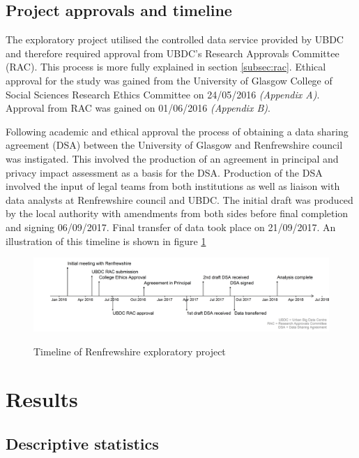 \documentclass[]{article}
\begin{document}
\subsection{Project approvals and timeline}\label{subsec:renf-methods-approvals}

The exploratory project utilised the controlled data service provided by
UBDC and therefore required approval from UBDC's Research Approvals
Committee (RAC). This process is more fully explained in section
\ref{subsec:rac}. Ethical approval for the study was gained from the
University of Glasgow College of Social Sciences Research Ethics
Committee on 24/05/2016 \emph{(Appendix A)}. Approval from RAC was
gained on 01/06/2016 \emph{(Appendix B)}.

Following academic and ethical approval the process of obtaining a data
sharing agreement (DSA) between the University of Glasgow and
Renfrewshire council was instigated. This involved the production of an
agreement in principal and privacy impact assessment as a basis for the
DSA. Production of the DSA involved the input of legal teams from both
institutions as well as liaison with data analysts at Renfrewshire
council and UBDC. The initial draft was produced by the local authority
with amendments from both sides before final completion and signing
06/09/2017. Final transfer of data took place on 21/09/2017. An
illustration of this timeline is shown in figure \ref{fig:ren-timeline}

\begin{figure}[h]
  \centering
    \caption{Timeline of Renfrewshire exploratory project}
    \includegraphics{figures/chapter-renf/renf-timeline.png}
    \label{fig:ren-timeline}
\end{figure}

\FloatBarrier

\section{Results}\label{sec:renf-results}

\subsection{Descriptive statistics}\label{subsec:renf-descriptives}
\end{document}
